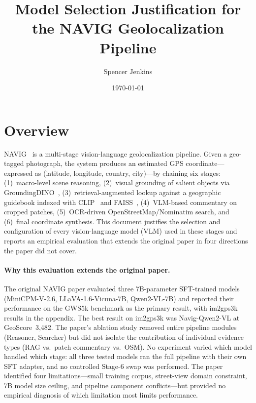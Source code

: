 \documentclass[11pt]{article}
\title{Model Selection Justification for the NAVIG Geolocalization Pipeline}
\author{Spencer Jenkins}
\date{\today}
\begin{document}
\maketitle

\tableofcontents
\bigskip

\section{Overview}

NAVIG~\citep{Yu2025NAVIG} is a multi-stage vision-language geolocalization pipeline. Given a
geo-tagged photograph, the system produces an estimated GPS coordinate---expressed as
(latitude, longitude, country, city)---by chaining six stages: (1)~macro-level scene reasoning,
(2)~visual grounding of salient objects via GroundingDINO~\citep{Liu2023GroundingDINO},
(3)~retrieval-augmented lookup against a geographic guidebook indexed with
CLIP~\citep{Radford2021CLIP} and FAISS~\citep{Johnson2021FAISS}, (4)~VLM-based commentary on
cropped patches, (5)~OCR-driven OpenStreetMap/Nominatim search, and (6)~final coordinate
synthesis. This document justifies the selection and configuration of every vision-language
model (VLM) used in these stages and reports an empirical evaluation that extends the
original paper in four directions the paper did not cover.

\paragraph{Why this evaluation extends the original paper.}
The original NAVIG paper evaluated three 7B-parameter SFT-trained models
(MiniCPM-V-2.6, LLaVA-1.6-Vicuna-7B, Qwen2-VL-7B) and reported their performance on
the GWS5k benchmark as the primary result, with im2gps3k results in the appendix.
The best result on im2gps3k was Navig-Qwen2-VL at GeoScore~3{,}482. The paper's
ablation study removed entire pipeline modules (Reasoner, Searcher) but did not
isolate the contribution of individual evidence types (RAG vs.\ patch commentary
vs.\ OSM). No experiment varied which model handled which stage: all three tested models
ran the full pipeline with their own SFT adapter, and no controlled Stage-6 swap
was performed. The paper identified four limitations---small training corpus,
street-view domain constraint, 7B model size ceiling, and pipeline component
conflicts---but provided no empirical diagnosis of which limitation most limits
performance.
\end{document}
